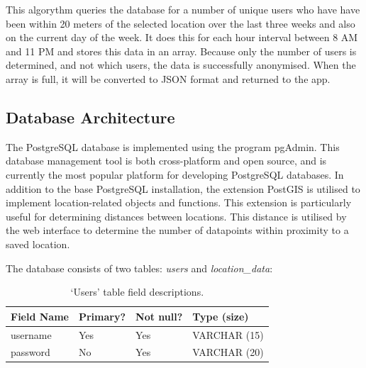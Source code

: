 This algorythm queries the database for a number of unique users who have have been within 20 meters of the selected location over the last three weeks and also on the current day of the week. It does this for each hour interval between 8 AM and 11 PM and stores this data in an array. Because only the number of users is determined, and not which users, the data is successfully anonymised. When the array is full, it will be converted to JSON format and returned to the app.

\subsection{Database Architecture}
The PostgreSQL database is implemented using the program pgAdmin. This database management tool is both cross-platform and open source, and is currently the most popular platform for developing PostgreSQL databases\cite{pgAdmin}. In addition to the base PostgreSQL installation, the extension PostGIS is utilised to implement location-related objects and functions. This extension is particularly useful for determining distances between locations. This distance is utilised by the web interface to determine the number of datapoints within proximity to a saved location. 

The database consists of two tables: \textit{users} and \textit{location\_data}:

\begin{table}[!htbp]
    \centering
    \begin{tabular}{llll}
    \hline
    \textbf{Field Name} & \textbf{Primary?} & \textbf{Not null?} & \textbf{Type (size)}  \\ \hline
    username   & Yes      & Yes       & VARCHAR (15) \\ \hline
    password   & No       & Yes       & VARCHAR (20) \\ \hline
    \end{tabular}
    \caption{`Users' table field descriptions.}
    \label{tab:des_tab1}
\end{table}



